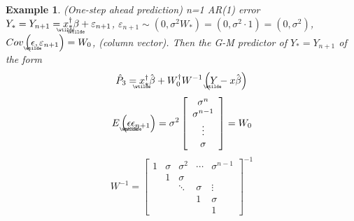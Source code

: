 \documentclass{article}
\newtheorem{example}[theorem]{Example}
\begin{document}
\begin{example}
(One-step ahead prediction) n=1 AR(1) error $Y_{\ast }=Y_{n+1}=%
\underaccent{\wtilde}{x}%
_{\ast }^{\dagger }%
\underaccent{\wtilde}{\beta}%
+\varepsilon _{n+1}$, $\varepsilon _{n+1}\sim \left( 0,\sigma ^{2}W_{\ast
}\right) =\left( 0,\sigma ^{2}\cdot 1\right) =\left( 0,\sigma ^{2}\right) $, 
$Cov\left( 
\underaccent{\wtilde}{\epsilon}%
,\varepsilon _{n+1}\right) =W_{0}$, (column vector). \newline
Then the G-M predictor of $Y_{\ast }=Y_{n+1}$ of the form%
\begin{equation*}
\hat{P}_{3}=%
\underaccent{\wtilde}{x}%
_{\ast }^{\dagger }\hat{\beta}+W_{0}^{\dagger }W^{-1}\left( 
\underaccent{\wtilde}{Y}%
-x\hat{\beta}\right)
\end{equation*}%
\begin{equation*}
E\left( 
\underaccent{\wtilde}{\epsilon}%
\underaccent{\wtilde}{\epsilon}%
_{n+1}\right) =\sigma ^{2}\left[ 
\begin{array}{c}
\sigma ^{n} \\ 
\sigma ^{n-1} \\ 
\vdots \\ 
\sigma%
\end{array}%
\right] =W_{0}
\end{equation*}%
\begin{equation*}
W^{-1}=\left[ 
\begin{array}{ccccc}
1 & \sigma & \sigma ^{2} & \cdots & \sigma ^{n-1} \\ 
& 1 & \sigma &  &  \\ 
&  & \ddots & \sigma & \vdots \\ 
&  &  & 1 & \sigma \\ 
&  &  &  & 1%
\end{array}%
\right] ^{-1}
\end{equation*}
\end{example}
\end{document}
